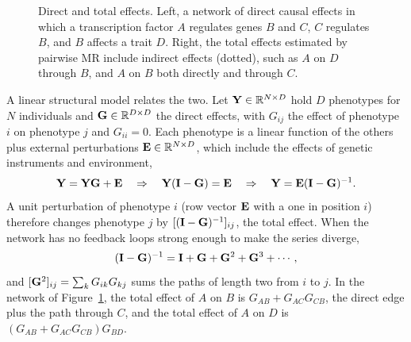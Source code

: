\begin{figure}[!htbp]
  \centering
  \caption{Direct and total effects. Left, a network of direct causal effects in which a transcription factor $A$ regulates genes $B$ and $C$, $C$ regulates $B$, and $B$ affects a trait $D$. Right, the total effects estimated by pairwise MR include indirect effects (dotted), such as $A$ on $D$ through $B$, and $A$ on $B$ both directly and through $C$.}
  \label{fig:networks}
\end{figure}

A linear structural model relates the two. Let $\mathbf{Y}\in\mathbb{R}^{N\times D}$ hold $D$ phenotypes for $N$ individuals and $\mathbf{G}\in\mathbb{R}^{D\times D}$ the direct effects, with $G_{ij}$ the effect of phenotype $i$ on phenotype $j$ and $G_{ii}=0$. Each phenotype is a linear function of the others plus external perturbations $\mathbf{E}\in\mathbb{R}^{N\times D}$, which include the effects of genetic instruments and environment,
\begin{equation}
  \mathbf{Y} = \mathbf{Y}\mathbf{G} + \mathbf{E} \quad\Rightarrow\quad \mathbf{Y}(\mathbf{I}-\mathbf{G}) = \mathbf{E} \quad\Rightarrow\quad \mathbf{Y} = \mathbf{E}(\mathbf{I}-\mathbf{G})^{-1}.
\end{equation}
A unit perturbation of phenotype $i$ (row vector $\mathbf{E}$ with a one in position $i$) therefore changes phenotype $j$ by $[(\mathbf{I}-\mathbf{G})^{-1}]_{ij}$, the total effect. When the network has no feedback loops strong enough to make the series diverge,
\begin{equation}
  (\mathbf{I}-\mathbf{G})^{-1} = \mathbf{I} + \mathbf{G} + \mathbf{G}^2 + \mathbf{G}^3 + \cdots,
\end{equation}
and $[\mathbf{G}^2]_{ij}=\sum_kG_{ik}G_{kj}$ sums the paths of length two from $i$ to $j$. In the network of Figure~\ref{fig:networks}, the total effect of $A$ on $B$ is $G_{AB}+G_{AC}G_{CB}$, the direct edge plus the path through $C$, and the total effect of $A$ on $D$ is $(G_{AB}+G_{AC}G_{CB})G_{BD}$.

